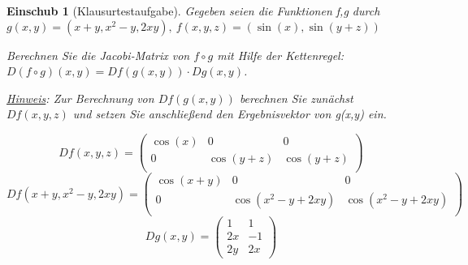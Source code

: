 \documentclass[12pt,a4paper]{scrreprt}
\newtheorem*{einschub}{Einschub}
\begin{document}
	\begin{einschub}[Klausurtestaufgabe]
		Gegeben seien die Funktionen f,g durch $g(x,y)=(x+y,x^2-y,2xy),\ f(x,y,z)=(\sin(x),\sin(y+z))$

		Berechnen Sie die Jacobi-Matrix von $f\circ g$ mit Hilfe der Kettenregel: $D(f\circ g)(x,y)=Df(g(x,y))\cdot Dg(x,y)$.

		\underline{Hinweis}: Zur Berechnung von $Df(g(x,y))$ berechnen Sie zunächst $Df(x,y,z)$ und setzen Sie anschließend den Ergebnisvektor von g(x,y) ein.

		\[Df(x,y,z)=\begin{pmatrix}
			\cos(x) & 0 & 0 \\
			0 & \cos(y+z) & \cos(y+z) \\\end{pmatrix}\]
		\[Df(x+y,x^2-y,2xy)=\begin{pmatrix}
				\cos(x+y) & 0 & 0 \\
				0 & \cos(x^2-y+2xy) & \cos(x^2-y+2xy) \\\end{pmatrix}\]
		\[Dg(x,y)=\begin{pmatrix}
			1 & 1 \\
			2x & -1 \\
			2y & 2x\end{pmatrix}\]
	\end{einschub}
\end{document}
